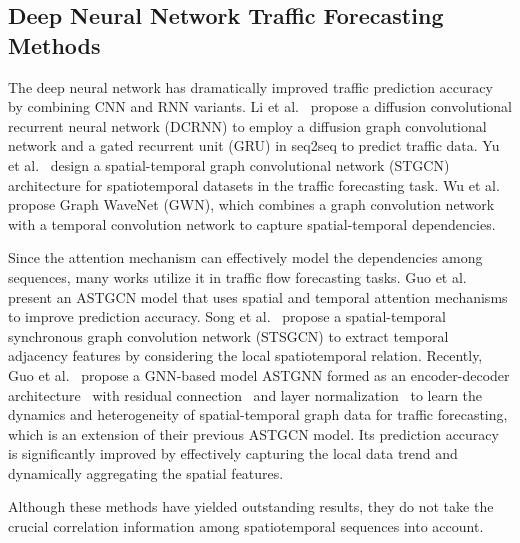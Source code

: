 \documentclass[sn-mathphys,iicol]{sn-jnl}
\theoremstyle{thmstyleone}\newtheorem{theorem}{Theorem}\newtheorem{proposition}[theorem]{Proposition}
\theoremstyle{thmstyletwo}\newtheorem{example}{Example}\newtheorem{remark}{Remark}
\theoremstyle{thmstylethree}\newtheorem{definition}{Definition}
\begin{document}
\subsection{Deep Neural Network Traffic Forecasting Methods}
The deep neural network has dramatically improved traffic prediction accuracy by combining CNN and RNN variants. 
Li et al.~\cite{li2018diffusion} propose a diffusion convolutional recurrent neural network (DCRNN) to employ a diffusion graph convolutional network and a gated recurrent unit (GRU) in seq2seq to predict traffic data.
Yu et al.~\cite{yu2018spatio} design a spatial-temporal graph convolutional network (STGCN) architecture for spatiotemporal datasets in the traffic forecasting task.
Wu et al.~\cite{Wu:2019} propose Graph WaveNet (GWN), which combines a graph convolution network with a temporal convolution network to capture spatial-temporal dependencies. 

Since the attention mechanism can effectively model the dependencies among sequences, many works utilize it in traffic flow forecasting tasks.
Guo et al.~\cite{Guo.2019} present an ASTGCN model that uses spatial and temporal attention mechanisms to improve prediction accuracy.
Song et al.~\cite{Song.2020} propose a spatial-temporal synchronous graph convolution network (STSGCN) to extract temporal adjacency features by considering the local spatiotemporal relation. 
Recently, Guo et al.~\cite{Guo.2021} propose a GNN-based model ASTGNN formed as an encoder-decoder architecture~\cite{Vaswani.2017} with residual connection~\cite{He:2016} and layer normalization~\cite{ba2016layer} to learn the dynamics and heterogeneity of spatial-temporal graph data for traffic forecasting, which is an extension of their previous ASTGCN model.
Its prediction accuracy is significantly improved by effectively capturing the local data trend and dynamically aggregating the spatial features.

Although these methods have yielded outstanding results, they do not take the crucial correlation information among spatiotemporal sequences into account.
\end{document}
